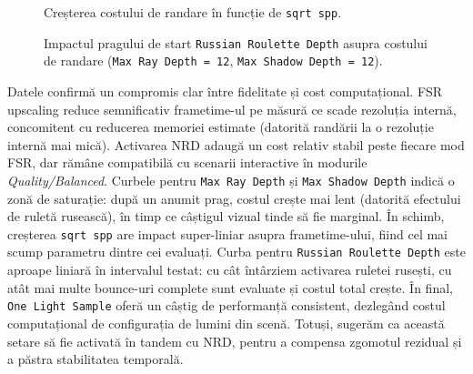 \documentclass[12pt,a4paper]{report}
\numberwithin{equation}{section} %
\begin{document}
\begin{figure}[htb]
    \centering
    \caption{Creșterea costului de randare în funcție de \texttt{sqrt spp}.}
    \label{fig:eval_sqrt_spp}
\end{figure}

\begin{figure}[htb]
    \centering
    \caption{Impactul pragului de start \texttt{Russian Roulette Depth} asupra costului de randare (\texttt{Max Ray Depth = 12}, \texttt{Max Shadow Depth = 12}).}
    \label{fig:eval_rr_depth}
\end{figure}


Datele confirmă un compromis clar între fidelitate și cost computațional.
FSR upscaling reduce semnificativ frametime-ul pe măsură ce scade rezoluția internă, concomitent cu reducerea memoriei estimate (datorită randării la o rezoluție internă mai mică).
Activarea NRD adaugă un cost relativ stabil peste fiecare mod FSR, dar rămâne compatibilă cu scenarii interactive în modurile \textit{Quality/Balanced}.
Curbele pentru \texttt{Max Ray Depth} și \texttt{Max Shadow Depth} indică o zonă de saturație: după un anumit prag, costul crește mai lent (datorită efectului de ruletă rusească), în timp ce câștigul vizual tinde să fie marginal.
În schimb, creșterea \texttt{sqrt spp} are impact super-liniar asupra frametime-ului, fiind cel mai scump parametru dintre cei evaluați.
Curba pentru \texttt{Russian Roulette Depth} este aproape liniară în intervalul testat: cu cât întârziem activarea ruletei rusești, cu atât mai multe bounce-uri complete sunt evaluate și costul total crește.
În final, \texttt{One Light Sample} oferă un câștig de performanță consistent, dezlegând costul computațional de configurația de lumini din scenă.
Totuși, sugerăm ca această setare să fie activată în tandem cu NRD, pentru a compensa zgomotul rezidual și a păstra stabilitatea temporală.
\end{document}
